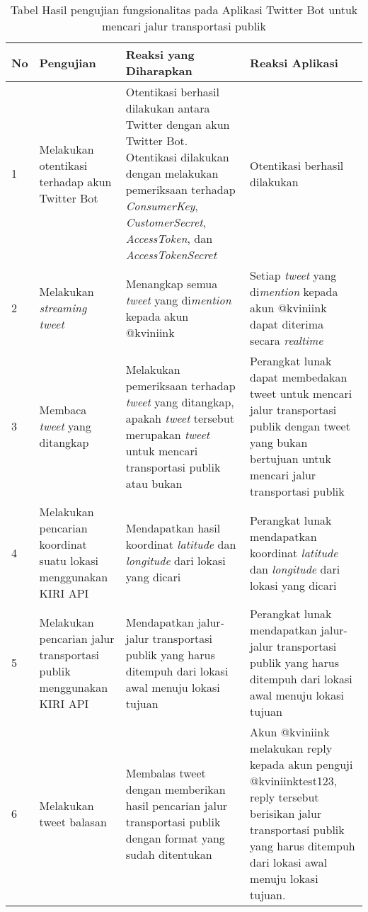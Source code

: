 \begin{table}[h]
		\begin{tabular}{|p{0.5cm}|p{3cm}|p{5cm}|p{5cm}|}
			\hline
				No & Pengujian & Reaksi yang Diharapkan & Reaksi Aplikasi  \\ \hline
				1 & Melakukan otentikasi terhadap akun Twitter Bot & Otentikasi berhasil dilakukan antara Twitter dengan akun Twitter Bot. Otentikasi dilakukan dengan melakukan pemeriksaan terhadap \textit{ConsumerKey}, \textit{CustomerSecret}, \textit{AccessToken}, dan \textit{AccessTokenSecret} &  Otentikasi berhasil dilakukan \\ \hline
				2 & Melakukan \textit{streaming tweet} & Menangkap semua \textit{tweet} yang di\textit{mention} kepada akun @kviniink & Setiap \textit{tweet} yang di\textit{mention} kepada akun @kviniink dapat diterima secara \textit{realtime}\\ \hline
				3 & Membaca \textit{tweet} yang ditangkap & Melakukan pemeriksaan terhadap \textit{tweet} yang ditangkap, apakah \textit{tweet} tersebut merupakan \textit{tweet} untuk mencari transportasi publik atau bukan & Perangkat lunak dapat membedakan tweet untuk mencari jalur transportasi publik dengan tweet yang bukan bertujuan untuk mencari jalur transportasi publik  \\ \hline
				4 & Melakukan pencarian koordinat suatu lokasi menggunakan KIRI API & Mendapatkan hasil koordinat \textit{latitude} dan \textit{longitude} dari lokasi yang dicari & Perangkat lunak mendapatkan koordinat \textit{latitude} dan \textit{longitude} dari lokasi yang dicari  \\ \hline
				5 & Melakukan pencarian jalur transportasi publik menggunakan KIRI API & Mendapatkan jalur-jalur transportasi publik yang harus ditempuh dari lokasi awal menuju lokasi tujuan &  Perangkat lunak mendapatkan jalur-jalur transportasi publik yang harus ditempuh dari lokasi awal menuju lokasi tujuan \\ \hline
				6 & Melakukan tweet balasan & Membalas tweet dengan memberikan hasil pencarian jalur transportasi publik dengan format yang sudah ditentukan &  Akun @kviniink melakukan reply kepada akun penguji @kviniinktest123, reply tersebut berisikan jalur transportasi publik yang harus ditempuh dari lokasi awal menuju lokasi tujuan.\\ \hline
		\end{tabular}
	\caption{Tabel Hasil pengujian fungsionalitas pada Aplikasi Twitter Bot untuk mencari jalur transportasi publik}
	\label{tab:TabelHasilPengujianFungsionalitasPadaAplikasiTwitterBotUntukMencariJalurTransportasiPublik}
\end{table}

